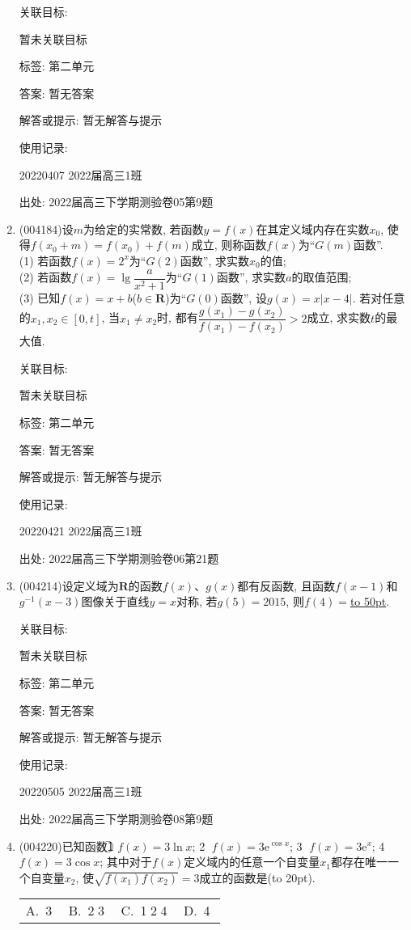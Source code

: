 \documentclass[10pt,a4paper]{article}
\newcommand{\blank}[1]{\underline{\hbox to #1pt{}}}
\newcommand{\bracket}[1]{(\hbox to #1pt{})}
\newcommand{\fourch}[4]{\par\begin{tabular}{p{.23\textwidth}p{.23\textwidth}p{.23\textwidth}p{.23\textwidth}}
A.~#1 &B.~#2& C.~#3& D.~#4
\end{tabular}}
\begin{document}
\begin{enumerate}[1.]
关联目标:

暂未关联目标



标签: 第二单元

答案: 暂无答案

解答或提示: 暂无解答与提示

使用记录:

20220407	2022届高三1班	


出处: 2022届高三下学期测验卷05第9题
\item { (004184)}设$m$为给定的实常数, 若函数$y=f(x)$在其定义域内存在实数$x_0$, 使得$f(x_0+m)=f(x_0)+f(m)$成立, 则称函数$f(x)$为``$G(m)$函数''.\\
(1) 若函数$f(x)=2^x$为``$G(2)$函数'', 求实数$x_0$的值;\\
(2) 若函数$f(x)=\lg \dfrac a{x^2+1}$为``$G(1)$函数'', 求实数$a$的取值范围;\\
(3) 已知$f(x)=x+b$($b\in \mathbf{R}$)为``$G(0)$函数'', 设$g(x)=x|x-4|$. 若对任意的$x_1,x_2\in[0,t]$, 当$x_1\ne x_2$时, 都有$\dfrac{g(x_1)-g(x_2)}{f(x_1)-f(x_2)}>2$成立, 求实数$t$的最大值.


关联目标:

暂未关联目标



标签: 第二单元

答案: 暂无答案

解答或提示: 暂无解答与提示

使用记录:

20220421	2022届高三1班			


出处: 2022届高三下学期测验卷06第21题
\item { (004214)}设定义域为$\mathbf{R}$的函数$f(x)$、$g(x)$都有反函数, 且函数$f(x-1)$和$g^{-1}(x-3)$图像关于直线$y=x$对称, 若$g(5)=2015$, 则$f(4)=$\blank{50}.


关联目标:

暂未关联目标



标签: 第二单元

答案: 暂无答案

解答或提示: 暂无解答与提示

使用记录:

20220505	2022届高三1班	


出处: 2022届高三下学期测验卷08第9题
\item { (004220)}已知函数\textcircled{1} $f(x)=3\ln x$; \textcircled{2} $f(x)=3\mathrm{e}^{\cos x}$; \textcircled{3} $f(x)=3\mathrm{e}^x$; \textcircled{4} $f(x)=3\cos x$; 其中对于$f(x)$定义域内的任意一个自变量$x_1$都存在唯一一个自变量$x_2$, 使$\sqrt{f(x_1)f(x_2)}=3$成立的函数是\bracket{20}.
\fourch{\textcircled{3}}{\textcircled{2}\textcircled{3}}{\textcircled{1}\textcircled{2}\textcircled{4}}{\textcircled{4}}



\end{enumerate}
\end{document}
